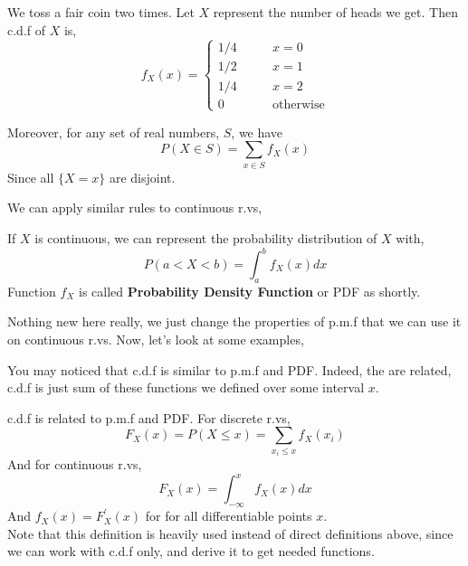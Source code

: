    \begin{example}
    We toss a fair coin two times. Let $X$ represent the number of heads we get. Then c.d.f of $X$ is,
    \[f_X(x) = 
        \begin{cases} 
          1/4 \qquad &x=0\\
          1/2 \qquad &x=1 \\
          1/4 \qquad &x=2\\
          0 \qquad &\text{otherwise}
        \end{cases} 
\]
\end{example}



Moreover, for any set of real numbers, $S$, we have
\[ P (X \in S) = \sum_{x \in S} f_X(x)\]
Since all $\{X = x \}$  are disjoint.\\
\par
We can apply similar rules to continuous r.vs,
\begin{definition}
    If $X$ is continuous, we can represent the probability distribution of $X$ with,
    \[ P(a < X < b) = \int_{a}^{b} f_X(x) dx \]
    Function  $f_X$ is called \textbf{Probability Density Function} or PDF as shortly.
\end{definition}
Nothing new here really, we just change the properties of p.m.f that we can use it on continuous r.vs. Now, let's look at some examples,\\
\par
You may noticed that c.d.f is similar to p.m.f and PDF. Indeed, the are related, c.d.f is just sum of these functions we defined over some interval $x$.
\begin{definition}
    c.d.f is related to p.m.f and PDF. For discrete r.vs,
    \[F_X(x) = P(X \le x) = \sum_{x_i \le x} f_X(x_i)\]
    And for continuous r.vs,
    \[F_X(x)= \int_{-\infty}^x f_X(x)dx \]
    And $f_X(x) = F_X^{'}(x)$ for for all differentiable points $x$.\\
  
    Note that this definition is heavily used instead of direct definitions above, since we can work with c.d.f only, and derive it to get needed functions.
\end{definition}
\par





